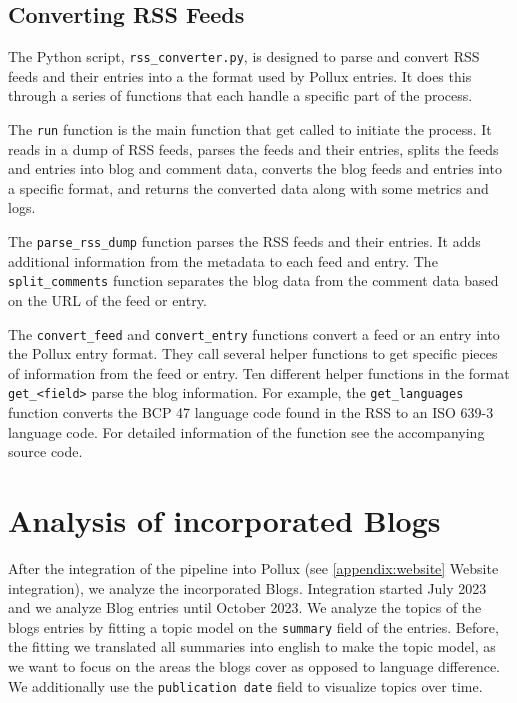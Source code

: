 \documentclass{article}
\begin{document}
\subsection{Converting RSS Feeds}

The Python script, \texttt{rss\_converter.py}, is designed to parse and convert RSS feeds and their entries into a the format used by Pollux entries. It does this through a series of functions that each handle a specific part of the process.

The \texttt{run} function is the main function that get called to initiate the process. It reads in a dump of RSS feeds, parses the feeds and their entries, splits the feeds and entries into blog and comment data, converts the blog feeds and entries into a specific format, and returns the converted data along with some metrics and logs.

The \texttt{parse\_rss\_dump} function parses the RSS feeds and their entries. It adds additional information from the metadata to each feed and entry.
The \texttt{split\_comments} function separates the blog data from the comment data based on the URL of the feed or entry.

The \texttt{convert\_feed} and \texttt{convert\_entry} functions convert a feed or an entry into the Pollux entry format. They call several helper functions to get specific pieces of information from the feed or entry.
Ten different helper functions in the format \texttt{get\_<field>} parse the  blog information. For example, the \texttt{get\_languages} function converts the BCP 47 language code found in the RSS to an ISO 639-3 language code. For detailed information of the function see the accompanying source code.

\section{Analysis of incorporated Blogs}

After the integration of the pipeline into Pollux (see \autoref{appendix:website} Website integration), we analyze the incorporated Blogs. Integration started July 2023 and we analyze Blog entries until October 2023. We analyze the topics of the blogs entries by fitting a topic model on the \texttt{summary} field of the entries. Before, the fitting we translated all summaries into english to make the topic model, as we want to focus on the areas the blogs cover as opposed to language difference. We additionally use the \texttt{publication date} field to visualize topics over time.
\end{document}
